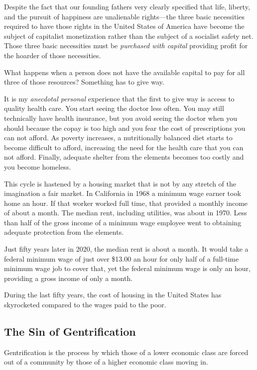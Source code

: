 Despite the fact that our founding fathers very clearly specified that life, liberty, and the pursuit of happiness are unalienable rights---the three basic necessities required to have those rights in the United States of America have become the subject of capitalist monetization rather than the subject of a socialist safety net. Those three basic necessities must be \emph{purchased with capital} providing profit for the hoarder of those necessities.

What happens when a person does not have the available capital to pay for all three of those resources? Something has to give way.

It is my \emph{anecdotal personal} experience that the first to give way is access to quality health care. You start seeing the doctor less often. You may still technically have health insurance, but you avoid seeing the doctor when you should because the copay is too high and you fear the cost of prescriptions you can not afford. As poverty increases, a nutritionally balanced diet starts to become difficult to afford, increasing the need for the health care that you can not afford. Finally, adequate shelter from the elements becomes too costly and you become homeless.

This cycle is hastened by a housing market that is not by any stretch of the imagination a fair market. In California in 1968 a minimum wage earner took home  an hour. If that worker worked full time, that provided a monthly income of about  a month. The median rent, including utilities, was about  in 1970. Less than half of the gross income of a minimum wage employee went to obtaining adequate protection from the elements.

Just fifty years later in 2020, the median rent is about  a month. It would take a federal minimum wage of just over \$13.00 an hour for only half of a full-time minimum wage job to cover that, yet the federal minimum wage is only  an hour, providing a gross income of only  a month.

During the last fifty years, the cost of housing in the United States has skyrocketed compared to the wages paid to the poor.

\subsection{The Sin of Gentrification}

Gentrification is the process by which those of a lower economic class are forced out of a community by those of a higher economic class moving in.

